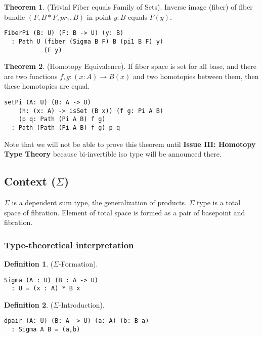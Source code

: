 \documentclass{article}
\theoremstyle{definition}
\newtheorem{theorem}{Theorem}
\newtheorem{definition}{Definition}
\begin{document}
\begin{theorem} (Trivial Fiber equals Family of Sets).
Inverse image (fiber) of fiber bundle $(F,B*F,pr_1,B)$ in point $y:B$ equals $F(y)$.
\begin{lstlisting}
FiberPi (B: U) (F: B -> U) (y: B)
  : Path U (fiber (Sigma B F) B (pi1 B F) y)
           (F y)
\end{lstlisting}
\end{theorem}

\begin{theorem} (Homotopy Equivalence).
If fiber space is set for all base, and
there are two functions $f,g : (x:A) \rightarrow B(x)$ and two
homotopies between them, then these homotopies are equal.
\begin{lstlisting}
setPi (A: U) (B: A -> U)
    (h: (x: A) -> isSet (B x)) (f g: Pi A B)
    (p q: Path (Pi A B) f g)
  : Path (Path (Pi A B) f g) p q
\end{lstlisting}
\end{theorem}

Note that we will not be able to prove this theorem
until {\bf Issue III: Homotopy Type Theory} because
bi-invertible iso type will be announced there.

\subsection{Context ($\Sigma$)}

$\Sigma$ is a dependent sum type, the generalization of products.
$\Sigma$ type is a total space of fibration. Element of total
space is formed as a pair of basepoint and fibration.

\subsubsection*{Type-theoretical interpretation}

\begin{definition} ($\Sigma$-Formation).
\begin{lstlisting}
Sigma (A : U) (B : A -> U)
  : U = (x : A) * B x
\end{lstlisting}
\end{definition}

\begin{definition} ($\Sigma$-Introduction).
\begin{lstlisting}
dpair (A: U) (B: A -> U) (a: A) (b: B a)
  : Sigma A B = (a,b)
\end{lstlisting}
\end{definition}
\end{document}
